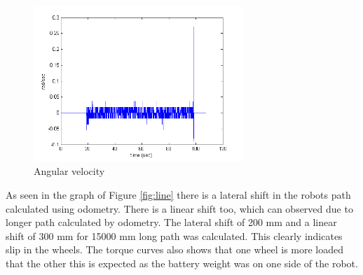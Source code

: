 \begin{figure}
\begin{minipage}[t]{0.5\textwidth}
	\end{minipage}
	\hfill
	\begin{minipage}[t]{0.5\textwidth}
		\centering
		\includegraphics[width=3.1in]{Chapter5/fig/linOmega} 
		\caption{Angular velocity}\label{fig:linOmega}
	\end{minipage}
\end{figure}

As seen in the graph of Figure \ref{fig:line} there is a lateral shift in the robots path calculated using odometry.  There is a linear shift too, which can observed due to longer path calculated by odometry. The lateral shift of 200 mm and a linear shift of 300 mm for 15000 mm long path was calculated. This clearly indicates slip in the wheels. The torque curves also shows that one wheel is more loaded that the other this is expected as the battery weight was on one side of the robot.

